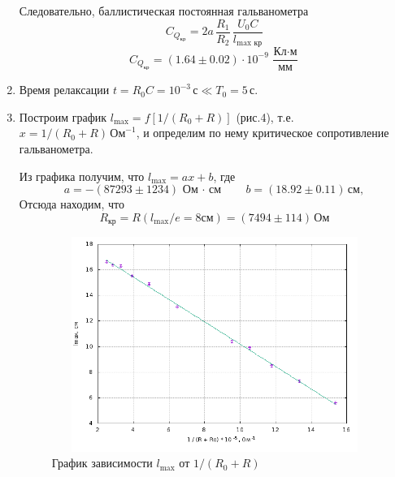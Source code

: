 \documentclass[12pt]{article}
\begin{document}
\begin{enumerate}
	\par
		Следовательно, баллистическая постоянная гальванометра 
\[
    C_\text{$Q_\text{кр}$} = 2a\, \frac{R_1}{R_2}\,\frac{U_0 C}{l_\text{max кр}}
\]	
\[
	C_\text{$Q_\text{кр}$} = \left(1.64 \pm 0.02 \right) \cdot 10^{-9}\, \frac{\text{Кл} \cdot\text{м}}{\text{мм}}
\]
	\item
		Время релаксации $t = R_0 C = 10^{-3}\, \text{с} \ll T_0 = 5 \, \text{с}$.
	\item
		Построим график $l_\text{max} = f[1 / \left(R_0 + R \right)]$ (рис.4), т.е. $x = 1 / \left(R_0 + R\right)\, \text{Ом}^{-1}$, и определим по нему критическое сопротивление гальванометра.
	\par
		Из графика получим, что $l_\text{max} = ax + b$, где
		\[
			a = - \left(87293 \pm 1234 \right) \, \text{Ом $\cdot$ см} \qquad b = \left(18.92 \pm 0.11 \right) \, \text{см},
	    \]
	    Отсюда находим, что
	    \[
	    	R_\text{кр} = R(l_\text{max} / e = 8 \text{см}) = \left(7494 \pm 114\right) \, \text{Ом}
	    \]
	    \begin{figure}[h!]
	    	\centering
	    	\includegraphics[width = 15cm, height = 7cm]{plot2.png}
	    	\caption{График зависимости $l_\text{max}$ от $1 / \left(R_0 + R\right)$}
	    \end{figure}	 		 
\end{enumerate}
\newpage
\end{document}
